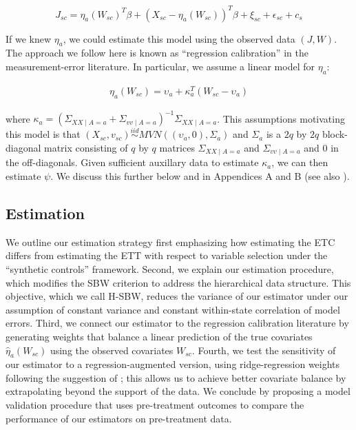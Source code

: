 \begin{equation}
    J_{sc} = \eta_a(W_{sc})^T\beta + (X_{sc} - \eta_a(W_{sc}))^T\beta + \xi_{sc} + \epsilon_{sc} + c_s 
\end{equation}

If we knew $\eta_a$, we could estimate this model using the observed data $(J, W)$. The approach we follow here is known as ``regression calibration'' in the measurement-error literature. In particular, we assume a linear model for $\eta_a$:

\begin{align*}
\eta_a(W_{sc}) = \upsilon_a + \kappa_a^T(W_{sc} - \upsilon_a)
\end{align*}

where $\kappa_a = (\Sigma_{XX \mid A = a} + \Sigma_{vv \mid A = a})^{-1}\Sigma_{XX \mid A = a}$. This assumptions motivating this model is that $(X_{sc}, v_{sc}) \stackrel{iid}\sim MVN((\upsilon_a, 0), \Sigma_a)$ and $\Sigma_a$ is a $2q$ by $2q$ block-diagonal matrix consisting of $q$ by $q$ matrices $\Sigma_{XX \mid A = a}$ and $\Sigma_{vv \mid A = a}$ and $0$ in the off-diagonals. Given sufficient auxillary data to estimate $\kappa_a$, we can then estimate $\psi$. We discuss this further below and in Appendices A and B (see also \cite{gleser1992importance}).

\subsection{Estimation}

We outline our estimation strategy first emphasizing how estimating the ETC differs from estimating the ETT with respect to variable selection under the ``synthetic controls'' framework. Second, we explain our estimation procedure, which modifies the SBW criterion to address the hierarchical data structure. This objective, which we call H-SBW, reduces the variance of our estimator under our assumption of constant variance and constant within-state correlation of model errors. Third, we connect our estimator to the regression calibration literature by generating weights that balance a linear prediction of the true covariates $\hat{\eta}_a(W_{sc})$ using the observed covariates $W_{sc}$. Fourth, we test the sensitivity of our estimator to a regression-augmented version, using ridge-regression weights following the suggestion of \cite{ben2018augmented}; this allows us to achieve better covariate balance by extrapolating beyond the support of the data. We conclude by proposing a model validation procedure that uses pre-treatment outcomes to compare the performance of our estimators on pre-treatment data.

